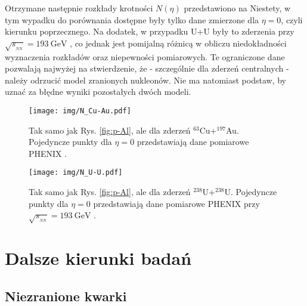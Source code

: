 \documentclass[a4paper,12pt]{article}
\begin{document}
Otrzymane następnie rozkłady krotności $N(\eta)$ przedstawiono na  Niestety, w tym wypadku do porównania dostępne były tylko dane zmierzone dla $\eta = 0$, czyli kierunku poprzecznego. Na dodatek, w przypadku U+U były to zderzenia przy $\sqrt{s_{_{NN}}} = 193~\text{GeV}$ \cite{Adare:2015bua}, co jednak jest pomijalną różnicą w obliczu niedokładności wyznaczenia rozkładów oraz niepewności pomiarowych. Te ograniczone dane pozwalają najwyżej na stwierdzenie, że - szczególnie dla zderzeń centralnych - należy odrzucić model zranionych nukleonów. Nie ma natomiast podstaw, by uznać za błędne wyniki pozostałych dwóch modeli.

\begin{figure}[H]
\begin{center}
\texttt{[image: img/N\_Cu-Au.pdf]}
\caption{Tak samo jak Rys. \ref{fig:p-Al}, ale dla zderzeń $^{63}$Cu+$^{197}$Au. Pojedyncze punkty dla $\eta=0$ przedstawiają dane pomiarowe PHENIX \cite{Adare:2015bua}.}\label{fig:Cu-Au}
\end{center}
\end{figure}
\begin{figure}[H]
\begin{center}
\texttt{[image: img/N\_U-U.pdf]}
\caption{Tak samo jak Rys. \ref{fig:p-Al}, ale dla zderzeń $^{238}$U+$^{238}$U. Pojedyncze punkty dla $\eta=0$ przedstawiają dane pomiarowe PHENIX przy $\sqrt{s_{_{NN}}} = 193~\text{GeV}$ \cite{Adare:2015bua}.}\label{fig:U-U}
\end{center}
\end{figure}

\newpage
\section{Dalsze kierunki badań}
\subsection{Niezranione kwarki}
\end{document}
